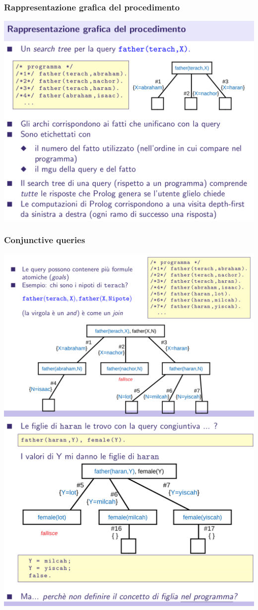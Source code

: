 \documentclass[10pt]{article}
\begin{document}
\subsubsection{Rappresentazione grafica del procedimento}
\includegraphics[scale=0.25]{Immagini/pl14.png}
\subsubsection{Conjunctive queries}
\includegraphics[scale=0.25]{Immagini/pl15.png}
\\
\includegraphics[scale=0.25]{Immagini/pl16.png}
\end{document}
